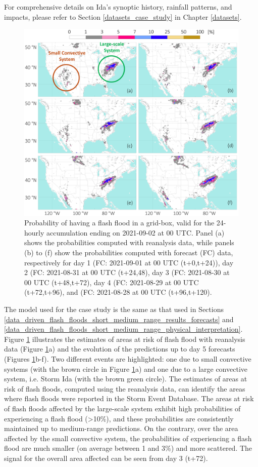 \documentclass[nhess, manuscript]{copernicus}
\begin{document}
For comprehensive details on Ida's synoptic history, rainfall patterns, and impacts, please refer to Section \ref{datasets_case_study} in Chapter \ref{datasets}.

\begin{figure}[t]
\includegraphics[width=12cm]{figures/case_study_poff.png}
\caption{Probability of having a flash flood in a grid-box, valid for the 24-hourly accumulation ending on 2021-09-02 at 00 UTC. Panel (a) shows the probabilities computed with reanalysis data, while panels (b) to (f) show the probabilities computed with forecast (FC) data, respectively for day 1 (FC: 2021-09-01 at 00 UTC (t+0,t+24)), day 2 (FC: 2021-08-31 at 00 UTC (t+24,48), day 3 (FC: 2021-08-30 at 00 UTC (t+48,t+72), day 4 (FC: 2021-08-29 at 00 UTC (t+72,t+96), and (FC: 2021-08-28 at 00 UTC (t+96,t+120).}
\label{fig:case_study_poff}
\end{figure}

The model used for the case study is the same as that used in Sections \ref{data_driven_flash_floods_short_medium_range_results_forecasts} and \ref{data_driven_flash_floods_short_medium_range_physical_interpretation}. 
Figure \ref{fig:case_study_poff} illustrates the estimates of areas at risk of flash flood with reanalysis data (Figure \ref{fig:case_study_poff}a) and the evolution of the predictions up to day 5 forecasts (Figures \ref{fig:case_study_poff}b-f). Two different events are highlighted: one due to small convective systems (with the brown circle in Figure \ref{fig:case_study_poff}a) and one due to a large convective system, i.e. Storm Ida (with the brown green circle). The estimates of areas at risk of flash floods, computed using the reanalysis data, can identify the areas where flash floods were reported in the Storm Event Database. The areas at risk of flash floods affected by the large-scale system exhibit high probabilities of experiencing a flash flood (>10\%), and these probabilities are consistently maintained up to medium-range predictions. On the contrary, over the area affected by the small convective system, the probabilities of experiencing a flash flood are much smaller (on average between 1 and 3\%) and more scattered. The signal for the overall area affected can be seen from day 3 (t+72).
\end{document}
